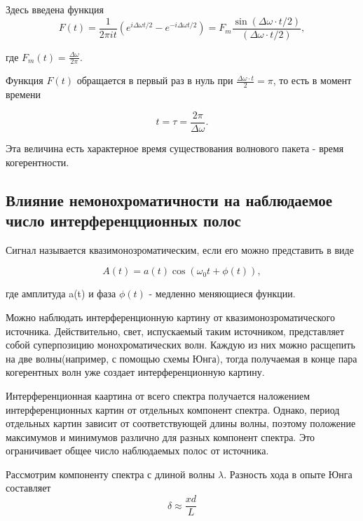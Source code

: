 Здесь введена функция
\begin{equation*}
    F(t) = \frac{1}{2\pi it }\left(e^{i\Delta\omega t/2} - e^{-i\Delta\omega t/2}\right) = F_m\frac{\sin(\Delta\omega\cdot t/2)}{(\Delta\omega\cdot t/2)},
\end{equation*}

где $F_m(t) = \frac{\Delta \omega}{2\pi}$.

\medskip

Функция $F(t)$ обращается в первый раз в нуль при $\frac{\Delta \omega \cdot t}{2} = \pi$,  то есть в момент времени

\begin{equation*}
    t = \tau = \frac{2\pi}{\Delta \omega}.
\end{equation*}

Эта величина есть характерное время существования волнового пакета - время когерентности.
\subsection{Влияние немонохроматичности на наблюдаемое число интерференцционных полос}

Сигнал называется квазимонозроматическим, если его можно представить в виде

\begin{equation*}
    A(t) = a(t)\cos(\omega_0t+\phi(t)),
\end{equation*}


где амплитуда a(t) и фаза $\phi(t)$ - медленно меняющиеся функции.

\bigskip

Можно наблюдать интерференционную картину от квазимонозроматического источника. Действительно, свет, испускаемый таким источником, представляет собой суперпозицию монохроматических волн. Каждую из них можно расщепить на две волны(например, с помощью схемы Юнга), тогда получаемая в конце пара когерентных волн уже создает интерференционную картину.

Интерференционная каартина от всего спектра получается наложением интерференционных картин от отдельных компонент спектра. Однако, период отдельных картин зависит от соответствующей длины волны, поэтому положение максимумов и минимумов различно для разных компонент спектра. Это ограничивает общее число наблюдаемых полос от источника.

\bigskip

Рассмотрим компоненту спектра с длиной волны $\lambda$. Разность хода в опыте Юнга составляет
\begin{equation*}
    \delta \approx \frac{xd}{L}
\end{equation*}

